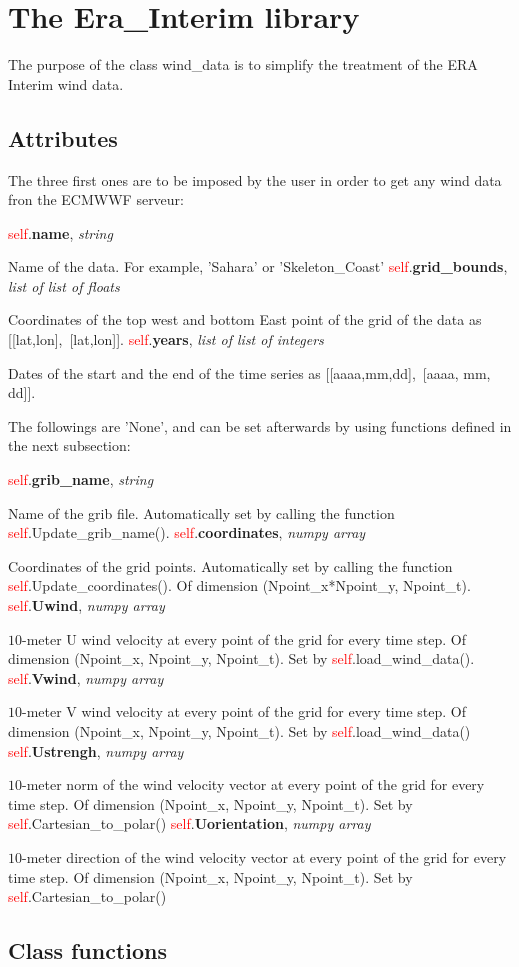 \documentclass[12pt]{article}
\newcommand{\Attribute}[3]{\filbreak\noindent
\qquad \textbullet \quad \textcolor{red}{self}.\textbf{#1}, \textit{{#2}}

{#3}
\vspace*{0.4 cm}}
\begin{document}
\section{The Era\_Interim library}
The purpose of the class wind\_data is to simplify the treatment of the ERA Interim wind data.

\subsection{Attributes}
The three first ones are to be imposed by the user in order to get any wind data fron the ECMWWF serveur:

\Attribute{name}{string}{Name of the data. For example, 'Sahara' or 'Skeleton\_Coast'}
\Attribute{grid\_bounds}{list of list of floats}{Coordinates of the top west and bottom East point of the grid of the data as [[lat,lon],~[lat,lon]].}
\Attribute{years}{list of list of integers}{Dates of the start and the end of the time series as [[aaaa,mm,dd],~[aaaa, mm, dd]].}

The followings are 'None', and can be set afterwards by using functions defined in the next subsection:

\Attribute{grib\_name}{string}{Name of the grib file. Automatically set by calling the function \textcolor{red}{self}.Update\_grib\_name().}
\Attribute{coordinates}{numpy array}{Coordinates of the grid points. Automatically set by calling the function \textcolor{red}{self}.Update\_coordinates(). Of dimension (Npoint\_x*Npoint\_y, Npoint\_t).}
\Attribute{Uwind}{numpy array}{$10$-meter U wind velocity at every point of the grid for every time step. Of dimension (Npoint\_x, Npoint\_y, Npoint\_t). Set by \textcolor{red}{self}.load\_wind\_data().}
\Attribute{Vwind}{numpy array}{$10$-meter V wind velocity at every point of the grid for every time step. Of dimension (Npoint\_x, Npoint\_y, Npoint\_t). Set by \textcolor{red}{self}.load\_wind\_data()}
\Attribute{Ustrengh}{numpy array}{$10$-meter norm of the wind velocity vector at every point of the grid for every time step. Of dimension (Npoint\_x, Npoint\_y, Npoint\_t). Set by \textcolor{red}{self}.Cartesian\_to\_polar()}
\Attribute{Uorientation}{numpy array}{$10$-meter direction of the wind velocity vector at every point of the grid for every time step. Of dimension (Npoint\_x, Npoint\_y, Npoint\_t). Set by \textcolor{red}{self}.Cartesian\_to\_polar()}

\subsection{Class functions}
\end{document}

